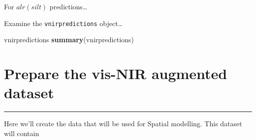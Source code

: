 \documentclass[]{book}
\newenvironment{Shaded}{\begin{snugshade}}{\end{snugshade}}
\newcommand{\DataTypeTok}[1]{\textcolor[rgb]{0.13,0.29,0.53}{#1}}
\newcommand{\DecValTok}[1]{\textcolor[rgb]{0.00,0.00,0.81}{#1}}
\newcommand{\KeywordTok}[1]{\textcolor[rgb]{0.13,0.29,0.53}{\textbf{#1}}}
\newcommand{\NormalTok}[1]{#1}
\newcommand{\OperatorTok}[1]{\textcolor[rgb]{0.81,0.36,0.00}{\textbf{#1}}}
\newcommand{\StringTok}[1]{\textcolor[rgb]{0.31,0.60,0.02}{#1}}
\begin{document}
For \(alr(silt)\) predictions\ldots{}

\begin{Shaded}
\end{Shaded}

Examine the \texttt{vnirpredictions} object\ldots{}

\begin{Shaded}
\begin{Highlighting}[]
\NormalTok{vnirpredictions}
\KeywordTok{summary}\NormalTok{(vnirpredictions)}
\end{Highlighting}
\end{Shaded}

\hypertarget{prepare-the-vis-nir-augmented-dataset}{%
\chapter{Prepare the vis-NIR augmented dataset}\label{prepare-the-vis-nir-augmented-dataset}}

\begin{center}\rule{0.5\linewidth}{\linethickness}\end{center}

Here we'll create the data that will be used for Spatial modelling. This dataset will contain
\end{document}
